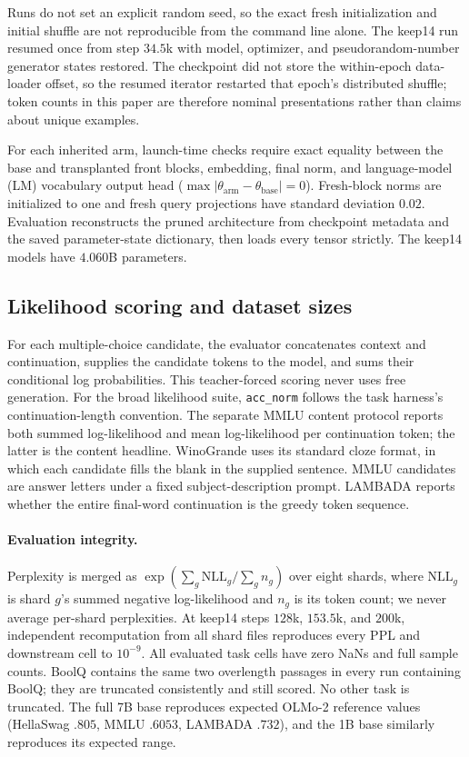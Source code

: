 Runs do not set an explicit random seed, so the exact fresh initialization and
initial shuffle are not reproducible from the command line alone. The keep14 run
resumed once from step $34.5$k with model, optimizer, and pseudorandom-number
generator states restored. The checkpoint did not store the within-epoch
data-loader offset, so the resumed iterator restarted that epoch's distributed
shuffle; token counts in this paper are therefore nominal presentations rather
than claims about unique examples.

For each inherited arm, launch-time checks require exact equality between the
base and transplanted front blocks, embedding, final norm, and language-model
(LM) vocabulary output head
($\max|\theta_{\mathrm{arm}}-\theta_{\mathrm{base}}|=0$). Fresh-block norms are
initialized to one and fresh query projections have standard deviation $0.02$.
Evaluation reconstructs the pruned architecture from checkpoint metadata and
the saved parameter-state dictionary, then loads every tensor strictly. The
keep14 models have $4.060$B parameters.

\subsection{Likelihood scoring and dataset sizes}


For each multiple-choice candidate, the evaluator concatenates context and
continuation, supplies the candidate tokens to the model, and sums their
conditional log probabilities. This teacher-forced scoring never uses free
generation. For the broad likelihood suite, \texttt{acc\_norm} follows the
task harness's continuation-length convention. The separate MMLU content
protocol reports both summed log-likelihood and mean log-likelihood per
continuation token; the latter is the content headline. WinoGrande uses its standard cloze format, in which each
candidate fills the blank in the supplied sentence.
MMLU candidates are answer letters under a fixed subject-description prompt.
LAMBADA reports whether the entire final-word continuation is the greedy
token sequence.

\paragraph{Evaluation integrity.}
Perplexity is merged as
$\exp(\sum_g\mathrm{NLL}_g/\sum_g n_g)$ over eight shards, where
$\mathrm{NLL}_g$ is shard $g$'s summed negative log-likelihood and $n_g$ is its
token count; we never average per-shard perplexities. At keep14 steps $128$k, $153.5$k, and $200$k,
independent recomputation from all shard files reproduces every PPL and downstream cell to
$10^{-9}$. All evaluated task cells have zero NaNs and full sample counts.
BoolQ contains the same two overlength passages in every run containing BoolQ;
they are truncated
consistently and still scored. No other task is truncated. The full 7B base reproduces expected
OLMo-2 reference values (HellaSwag $.805$, MMLU $.6053$, LAMBADA $.732$), and
the 1B base similarly reproduces its expected range.

